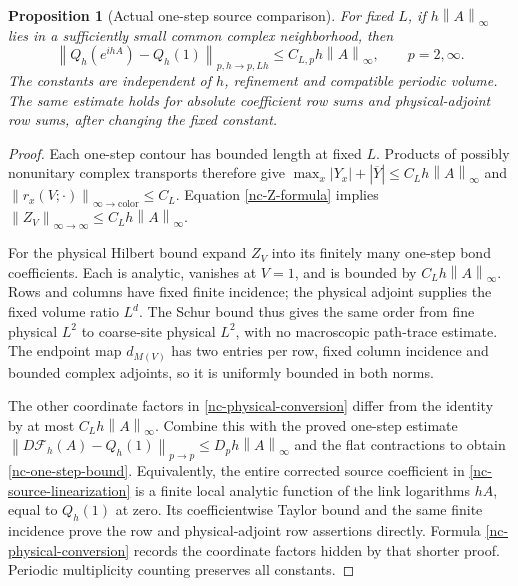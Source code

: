 \documentclass[11pt]{article}
\newtheorem{proposition}[theorem]{Proposition}
\theoremstyle{remark}
\newcommand{\norm}[1]{\left\|#1\right\|}
\begin{document}
\begin{proposition}[Actual one-step source comparison]
\label{nc-one-step-proposition}
For fixed $L$, if $h\norm{A}_\infty$ lies in a sufficiently small
common complex neighborhood, then
\begin{equation}
 \norm{Q_h(e^{ihA})-Q_h(1)}_{p,h\to p,Lh}
     \le C_{L,p}h\norm{A}_\infty,
 \qquad p=2,\infty.
 \label{nc-one-step-bound}
\end{equation}
The constants are independent of $h$, refinement and compatible
periodic volume. The same estimate holds for absolute coefficient
row sums and physical-adjoint row sums, after changing the fixed
constant.
\end{proposition}

\begin{proof}
Each one-step contour has bounded length at fixed $L$. Products of
possibly nonunitary complex transports therefore give
$\max_x|Y_x|+|\overline Y|\le C_Lh\norm{A}_\infty$ and
$\norm{r_x(V;\cdot)}_{\infty\to\mathrm{color}}\le C_L$.
Equation \eqref{nc-Z-formula} implies
$\norm{Z_V}_{\infty\to\infty}\le C_Lh\norm{A}_\infty$.

For the physical Hilbert bound expand $Z_V$ into its finitely many
one-step bond coefficients. Each is analytic, vanishes at $V=1$,
and is bounded by $C_Lh\norm{A}_\infty$. Rows and columns have
fixed finite incidence; the physical adjoint supplies the fixed
volume ratio $L^d$. The Schur bound thus gives the same order
from fine physical $L^2$ to coarse-site physical $L^2$, with no
macroscopic path-trace estimate. The endpoint map $d_{M(V)}$ has
two entries per row, fixed column incidence and bounded complex
adjoints, so it is uniformly bounded in both norms.

The other coordinate factors in \eqref{nc-physical-conversion}
differ from the identity by at most $C_Lh\norm{A}_\infty$.
Combine this with the proved one-step estimate
$\norm{D\mathcal F_h(A)-Q_h(1)}_{p\to p}
\le D_ph\norm{A}_\infty$ and the flat contractions to obtain
\eqref{nc-one-step-bound}. Equivalently, the entire corrected
source coefficient in \eqref{nc-source-linearization} is a finite
local analytic function of the link logarithms $hA$, equal to
$Q_h(1)$ at zero. Its coefficientwise Taylor bound and the same
finite incidence prove the row and physical-adjoint row assertions
directly. Formula \eqref{nc-physical-conversion} records the
coordinate factors hidden by that shorter proof. Periodic
multiplicity counting preserves all constants.
\end{proof}
\end{document}
